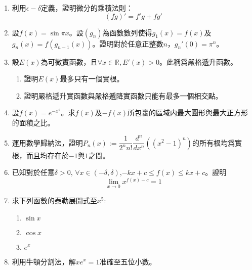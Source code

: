 \documentclass[12pt]{article}
\begin{document}
    \begin{enumerate}
        \item 利用$\epsilon-\delta$定義，證明微分的乘積法則：$$(fg)'=f'g+fg'$$
        \item 設$f(x)=\sin{\pi x}$。設$(g_n)$為函數數列使得$g_1(x)=f(x)$及$g_n(x)=f(g_{n-1}(x))$。證明對於任意正整數$n$，$g_n'(0)=\pi^n$。
        \item 設$E(x)$為可微實函數，且$\forall x\in \mathbb{R}, E'(x)>0$。此稱爲嚴格遞升函數。\begin{enumerate}
            \item 證明$E(x)$最多只有一個實根。
            \item 證明嚴格遞升實函數與嚴格遞降實函數只能有最多一個相交點。
        \end{enumerate}
        \item 設$f(x)=e^{-x^2}$。求$f(x)$及$-f(x)$所包裹的區域内最大圓形與最大正方形的面積之比。
        \item 運用數學歸納法，證明$P_n(x):=\dfrac{1}{2^n n!}\dfrac{d^n}{dx^n}((x^2-1)^n)$的所有根均爲實根，而且均存在於$-1$與$1$之間。
        \item 已知對於任意$\delta>0$, $\forall x\in (-\delta,\delta)$,$-kx+c\leq f(x)\leq kx+c$。證明$$\lim_{x\to 0}x^{f(x)-c}=1$$
        \item 求下列函數的泰勒展開式至$x^5$:\begin{enumerate}
            \item $\sin{x}$
            \item $\cos{x}$
            \item $e^x$
        \end{enumerate}
        \item 利用牛頓分割法，解$xe^x=1$准確至五位小數。
    \end{enumerate}
\end{document}

